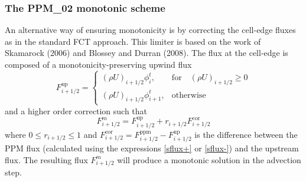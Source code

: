   \subsubsection{The PPM\_02 monotonic scheme}  

  An alternative way of ensuring monotonicity is by correcting the
  cell-edge fluxes as in the standard FCT approach. This limiter is
  based on the work of Skamarock (2006) and Blossey and Durran
  (2008). The flux at the cell-edge is composed of a
  monotonicity-preserving upwind flux
  \begin{equation}
    F^{\mathrm{up}}_{i+1/2} = \left\{ \begin{array}{ll}
    (\rho U)_{i+1/2} \phi^{t}_{i}, & \mathrm{for} \quad (\rho U)_{i+1/2}
    \ge 0 \\
    (\rho U)_{i+1/2} \phi^{t}_{i+1}, & \mathrm{otherwise} 
    \end{array}\right.
  \end{equation}
  and a higher order correction such that
  \begin{equation}
    F^{m}_{i+1/2} = F^{\mathrm{up}}_{i+1/2} + r_{i+1/2}F^{\mathrm{cor}}_{i+1/2}
  \end{equation}
  where $0 \le r_{i+1/2} \le 1$ and $F^{\mathrm{cor}}_{i+1/2} =
  F^{\mathrm{ppm}}_{i+1/2} - F^{\mathrm{up}}_{i+1/2}$ is the difference
  between the PPM flux (calculated using the expressions \ref{sflux+} or
  \ref{sflux-}) and the upstream flux. The resulting flux
  $F^{m}_{i+1/2}$ will produce a monotonic solution in the advection step.

